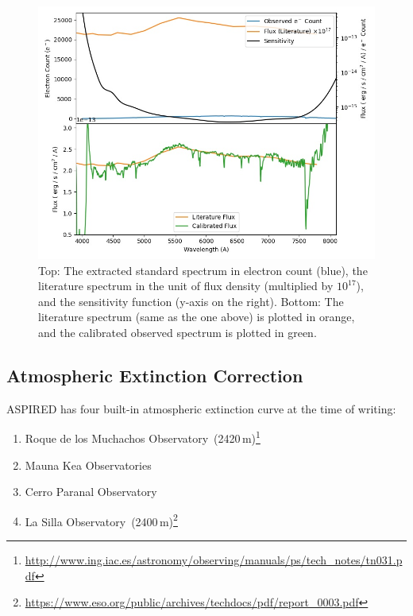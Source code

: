 \documentclass[fleqn,usenatbib]{mnras}
\begin{document}
\begin{figure}
    \centering
    \includegraphics[width=\columnwidth]{fig_06_flux_calibration_diagnostics.jpg}
    \caption{Top: The extracted standard spectrum in electron count
    (blue), the literature spectrum in the unit of flux density (multiplied
    by $10^{17}$), and the sensitivity function (y-axis on the right).
    Bottom: The literature spectrum (same as the one above) is plotted
    in orange, and the calibrated observed spectrum is plotted in green.}
    \label{fig:wavecal}
\end{figure}

\subsection*{Atmospheric Extinction Correction}
\textsc{ASPIRED} has four built-in atmospheric extinction curve at the time
of writing:

\begin{enumerate}
    \item Roque de los Muchachos Observatory~(2420\,m)\footnote{\url{http://www.ing.iac.es/astronomy/observing/manuals/ps/tech\_notes/tn031.pdf}}
    \item Mauna Kea Observatories~\citep[4205\,m;][]{2013A&A...549A...8B}
    \item Cerro Paranal Observatory~\citep[2635\,m;][]{2011A&A...527A..91P}
    \item La Silla Observatory~(2400\,m)\footnote{\url{https://www.eso.org/public/archives/techdocs/pdf/report\_0003.pdf}}
\end{enumerate}
\end{document}
